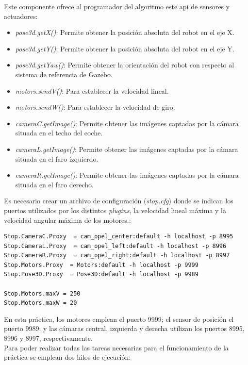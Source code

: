 Este componente ofrece al programador del algoritmo este \acrshort{api} de sensores y actuadores:

\begin{itemize}
\item 	\textit{pose3d.getX()}: Permite obtener la posición absoluta del robot en el eje X.
\item	\textit{pose3d.getY()}: Permite obtener la posición absoluta del robot en el eje Y.
\item	\textit{pose3d.getYaw()}: Permite obtener la orientación del robot con respecto al sistema de referencia de Gazebo.
\item 	\textit{motors.sendV()}: Para establecer la velocidad lineal.
\item	\textit{motors.sendW()}: Para establecer la velocidad de giro.
\item	\textit{cameraC.getImage()}: Permite obtener las imágenes captadas por la cámara situada en el techo del coche.
\item	\textit{cameraL.getImage()}: Permite obtener las imágenes captadas por la cámara situada en el faro izquierdo.
\item	\textit{cameraR.getImage()}: Permite obtener las imágenes captadas por la cámara situada en el faro derecho.
\end{itemize}

Es necesario crear un archivo de configuración (\textit{stop.cfg}) donde se indican los puertos utilizados por los distintos \textit{plugins}, la velocidad lineal máxima y la velocidad angular máxima de los motores.:

\vspace{20pt}
	\begin{lstlisting}[frame=single]
Stop.CameraC.Proxy  = cam_opel_center:default -h localhost -p 8995
Stop.CameraL.Proxy  = cam_opel_left:default -h localhost -p 8996
Stop.CameraR.Proxy  = cam_opel_right:default -h localhost -p 8997
Stop.Motors.Proxy  = Motors:default -h localhost -p 9999
Stop.Pose3D.Proxy  = Pose3D:default -h localhost -p 9989

Stop.Motors.maxV = 250
Stop.Motors.maxW = 20
	\end{lstlisting}

En esta práctica, los motores emplean el puerto 9999; el sensor de posición el puerto 9989; y las cámaras central, izquierda y derecha utilizan los puertos 8995, 8996 y 8997, respectivamente. \\

Para poder realizar todas las tareas necesarias para el funcionamiento de la práctica se emplean dos hilos de ejecución:

